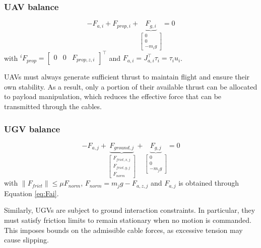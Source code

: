 \subsubsection{UAV balance} %
\begin{equation}
    -F_{a,i} + F_{prop, i} + \underbrace{F_{g,i}}_{\begin{bmatrix}
        0 \\ 0 \\ - m_{i} g
    \end{bmatrix}} = 0
    \label{eq:uavbalance}
\end{equation}
with $^iF_{prop} = \begin{bmatrix}
        0 & 0 & F_{prop,z,i}
    \end{bmatrix}^\top$ and $F_{a, i} = J_{a, i}^\top \tau_i = \tau_i u_i$.

UAVs must always generate sufficient thrust to maintain flight and ensure their own stability. As a result, only a portion of their available thrust can be allocated to payload manipulation, which reduces the effective force that can be transmitted through the cables.

\subsubsection{UGV balance}
\begin{equation}
    -F_{a,j} + \underbrace{F_{ground, j}}_{\begin{bmatrix}
        F_{frict,x,j} \\ F_{frict,y,j} \\ F_{norm}
    \end{bmatrix}} + \underbrace{F_{g,j}}_{\begin{bmatrix}
        0 \\ 0 \\ - m_{j} g
    \end{bmatrix}} = 0
    \label{eq:ugvbalance}
\end{equation}
with $\|F_{frict}\| \le \mu F_{norm}$, $F_{norm} = m_j g - F_{a, z, j}$ and $F_{a,j}$ is obtained through Equation \ref{eq:Fai}.

Similarly, UGVs are subject to ground interaction constraints. In particular, they must satisfy friction limits to remain stationary when no motion is commanded. This imposes bounds on the admissible cable forces, as excessive tension may cause slipping.



